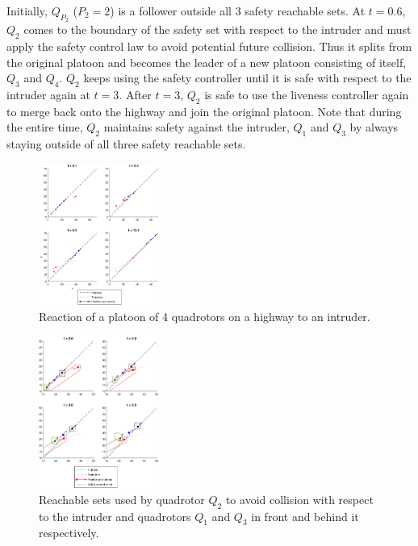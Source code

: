Initially, $Q_{P_2}$ ($P_2=2$) is a follower outside all 3 safety reachable sets. At $t=0.6$, $Q_2$ comes to the boundary of the safety set with respect to the intruder and must apply the safety control law to avoid potential future collision. Thus it splits from the original platoon and becomes the leader of a new platoon consisting of itself, $Q_3$ and $Q_4$. $Q_2$ keeps using the safety controller until it is safe with respect to the intruder again at $t=3$. After $t=3$, $Q_2$ is safe to use the liveness controller again to merge back onto the highway and join the original platoon. Note that during the entire time, $Q_2$ maintains safety against the intruder, $Q_1$ and $Q_3$ by always staying outside of all three safety reachable sets.


\begin{figure}
	\centering
	\includegraphics[width=0.35\textwidth]{fig/Intruder1}
	\caption{Reaction of a platoon of 4 quadrotors on a highway to an intruder.}
	\label{fig:intruder1}
\end{figure}

\begin{figure}
	\centering
		\includegraphics[width=0.35\textwidth]{fig/Intruder2}
	\caption{Reachable sets used by quadrotor $Q_2$ to avoid collision with respect to the intruder and quadrotors $Q_1$ and $Q_3$ in front and behind it respectively.}
	\label{fig:intruder2}
\end{figure}

